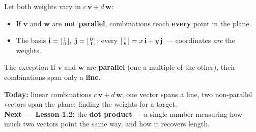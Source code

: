 \documentclass[aspectratio=169, 11pt]{beamer}
\newcommand{\vv}{\mathbf{v}}
\newcommand{\ww}{\mathbf{w}}
\begin{document}
\begin{frame}[t, plain]
  Let both weights vary in $c\,\vv+d\,\ww$:
  \begin{itemize}
    \item If $\vv$ and $\ww$ are \textbf{not parallel}, combinations reach \textbf{every} point in the plane.
    \item The basis $\mathbf{i}=\begin{bsmallmatrix} 1\\0 \end{bsmallmatrix},\ \mathbf{j}=\begin{bsmallmatrix} 0\\1 \end{bsmallmatrix}$:
          every $\begin{bsmallmatrix} x\\y \end{bsmallmatrix}=x\,\mathbf{i}+y\,\mathbf{j}$ --- coordinates \emph{are} the weights.
  \end{itemize}
  \begin{block}{The exception}
    If $\vv$ and $\ww$ are \textbf{parallel} (one a multiple of the other), their combinations
    span only a \textbf{line}.
  \end{block}
\end{frame}

\begin{frame}[t, plain]
  \textbf{Today:} linear combinations $c\,\vv+d\,\ww$; one vector spans a line, two
  non-parallel vectors span the plane; finding the weights for a target.\\[8pt]
  \textbf{Next --- Lesson 1.2:} the \textbf{dot product} --- a single number measuring how much
  two vectors point the same way, and how it recovers length.
\end{frame}
\end{document}
